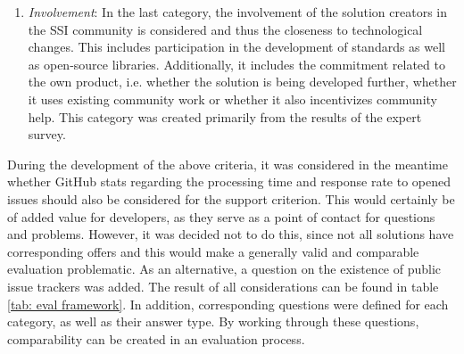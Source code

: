 \begin{enumerate}
        \item \textit{Involvement}: In the last category, the involvement of the solution creators in the \ac{SSI} community is considered and thus the closeness to technological changes. This includes participation in the development of standards as well as open-source libraries. Additionally, it includes the commitment related to the own product, i.e. whether the solution is being developed further, whether it uses existing community work or whether it also incentivizes community help. This category was created primarily from the results of the expert survey.
    \end{enumerate}
    
    During the development of the above criteria, it was considered in the meantime whether GitHub stats regarding the processing time and response rate to opened issues should also be considered for the support criterion. This would certainly be of added value for developers, as they serve as a point of contact for questions and problems. However, it was decided not to do this, since not all solutions have corresponding offers and this would make a generally valid and comparable evaluation problematic. As an alternative, a question on the existence of public issue trackers was added. The result of all considerations can be found in table \ref{tab: eval framework}. In addition, corresponding questions were defined for each category, as well as their answer type. By working through these questions, comparability can be created in an evaluation process.
    
